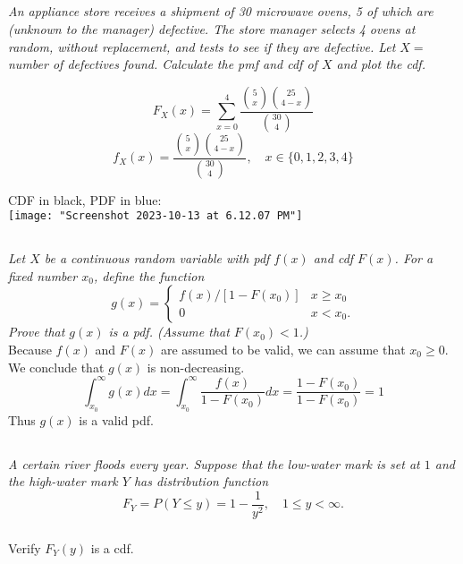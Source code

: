 \documentclass[12pt]{amsart}
\begin{document}
\setcounter{subsection}{50}
\subsection{} %
\textit{An appliance store receives a shipment of 30 microwave ovens, 5 of which are (unknown
	to the manager) defective. The store manager selects 4 ovens at random, without
	replacement, and tests to see if they are defective. Let \(X =\) number of defectives
	found. Calculate the pmf and cdf of \(X\) and plot the cdf.}

	\[ F_X(x) = \sum_{x=0}^{4} \frac{\binom{5}{x}\binom{25}{4-x}}{\binom{30}{4}} \]
	\[ f_X(x) = \frac{\binom{5}{x}\binom{25}{4-x}}{\binom{30}{4}}, \quad x\in\{0,1,2,3,4\} \]

	CDF in black, PDF in blue:\\
	\texttt{[image: "Screenshot 2023-10-13 at 6.12.07 PM"]}



\subsection{} %
\textit{Let \(X\) be a continuous random variable with pdf \(f(x)\) and cdf \(F(x)\). For a fixed number \(x_0\), define the function
	\[g(x) = \begin{cases}
		f(x)/[1 − F(x_0)] & x\geq x_0 \\
		0 & x < x_0.
	\end{cases} \]
	Prove that \(g(x)\) is a pdf. (Assume that \(F(x_0) < 1\).)} \\
	
	Because \(f(x)\) and \(F(x)\) are assumed to be valid, we can assume that \(x_0 \geq 0\). We conclude that \(g(x)\) is non-decreasing.
	\[ \int_{x_0}^{\infty}g(x)dx = \int_{x_0}^{\infty}\frac{f(x)}{1-F(x_0)}dx = \frac{1-F(x_0)}{1-F(x_0)} = 1 \]
	Thus \(g(x)\) is a valid pdf.
	

\subsection{} %
\textit{A certain river floods every year. Suppose that the low-water mark is set at \(1\) and the
	high-water mark \(Y\) has distribution function}
	\[ F_Y = P(Y\leq y) = 1-\frac{1}{y^2}, \quad 1\leq y<\infty. \]
	\subsubsection{} Verify \(F_Y(y)\) is a cdf.
	
\end{document}
